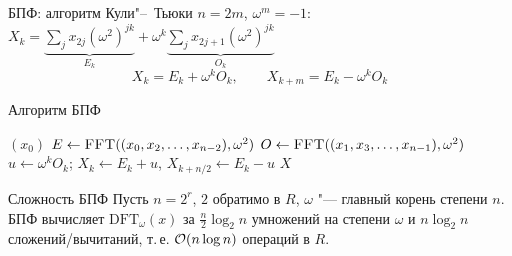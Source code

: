 \documentclass{ca-slides}
\begin{document}
\begin{canvasframe}{БПФ: алгоритм Кули"--~Тьюки}
  $n = 2m$, $\omega^m = -1$:\quad
  $X_k = \underbrace{\textstyle\sum_j x_{2j} (\omega^2)^{jk}}_{E_k}
       + \omega^k \underbrace{\textstyle\sum_j x_{2j+1} (\omega^2)^{jk}}_{O_k}$
  \[
    \boxed{\;X_k = E_k + \omega^k O_k, \qquad X_{k+m} = E_k - \omega^k O_k\;}
  \]
  \centering
\end{canvasframe}

\begin{canvasframe}{Алгоритм БПФ}
  \begin{algorithmic}[1]
     
       \Return $(x_0)$ \EndIf
      \State $E \gets \Call{FFT}{(x_0, x_2, \dots, x_{n-2}), \omega^2}$
      \State $O \gets \Call{FFT}{(x_1, x_3, \dots, x_{n-1}), \omega^2}$
        \State $u \gets \omega^k O_k$; \quad $X_k \gets E_k + u$, \quad $X_{k+n/2} \gets E_k - u$
      \EndFor
      \State \Return $X$
    \EndFunction
  \end{algorithmic}
  \penspace[0.15\textheight]
\end{canvasframe}

\begin{theoremframe}{Сложность БПФ}
  Пусть $n = 2^r$, $2$ обратимо в $R$, $\omega$ "--- главный корень степени $n$. БПФ вычисляет
  $\mathrm{DFT}_\omega(x)$ за $\frac n2 \log_2 n$ умножений на степени $\omega$ и
  $n \log_2 n$ сложений/вычитаний, т.\,е. $\mathcal{O}(n \log n)$ операций в $R$.
\end{theoremframe}
\end{document}
